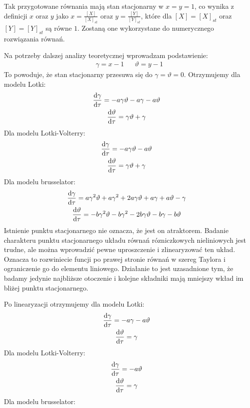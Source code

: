 \documentclass[10pt, a4paper, twoside, onecolumn]{article}
\numberwithin{equation}{section}
\begin{document}
	Tak przygotowane równania mają stan stacjonarny w \(x=y=1\), co wynika z definicji \(x\) oraz \(y\) jako \(x=\frac{[X]}{[X]_{st}}\) oraz \(y=\frac{[Y]}{[Y]_{st}}\), które dla \([X]=[X]_{st}\) oraz \([Y]=[Y]_{st}\) są równe \(1\). Zostaną one wykorzystane do numerycznego rozwiązania równań. \par
	Na potrzeby dalszej analizy teoretycznej wprowadzam podstawienie:
	\begin{align*}
		& \gamma=x-1 && \vartheta=y-1
	\end{align*}
	To powoduje, że stan stacjonarny przesuwa się do \(\gamma=\vartheta=0\). Otrzymujemy dla modelu Lotki:
	\begin{gather}
		\dv{\gamma}{\tau}=-a\gamma\vartheta-a\gamma-a\vartheta \\
		\dv{\vartheta}{\tau}=\gamma\vartheta+\gamma
	\end{gather}
	Dla modelu Lotki-Volterry:
	\begin{gather}
		\dv{\gamma}{\tau}=-a\gamma\vartheta-a\vartheta \\
		\dv{\vartheta}{\tau}=\gamma\vartheta+\gamma
	\end{gather}
	Dla modelu brusselator:
	\begin{gather}
		\dv{\gamma}{\tau}=a\gamma^{2}\vartheta+a\gamma^{2}+2a\gamma\vartheta+a\gamma+a\vartheta-\gamma \\
		\dv{\vartheta}{\tau}=-b\gamma^{2}\vartheta-b\gamma^{2}-2b\gamma\vartheta-b\gamma-b\vartheta
	\end{gather}
	Istnienie punktu stacjonarnego nie oznacza, że jest on atraktorem. Badanie charakteru punktu stacjonarnego układu równań rózniczkowych nieliniowych jest trudne, ale można wprowadzić pewne uproszczenie i zlinearyzować ten układ. Oznacza to rozwiniecie funcji po prawej stronie równań w szereg Taylora i ograniczenie go do elementu liniowego. Działanie to jest uzasadnione tym, że badamy jedynie najbliższe otoczenie i kolejne składniki mają mniejszy wkład im bliżej punktu stacjonarnego. \par
	Po linearyzacji otrzymujemy dla modelu Lotki:
	\begin{gather}
		\dv{\gamma}{\tau}=-a\gamma-a\vartheta \\
		\dv{\vartheta}{\tau}=\gamma
	\end{gather}
	Dla modelu Lotki-Volterry:
	\begin{gather}
		\dv{\gamma}{\tau}=-a\vartheta \\
		\dv{\vartheta}{\tau}=\gamma
	\end{gather}
	Dla modelu brusselator:
\end{document}
